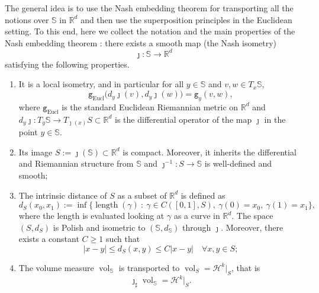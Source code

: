 \documentclass[10pt,leqno]{amsart}
\numberwithin{equation}{section}
\newcommand{\R}{\mathbb{R}}
\newcommand{\ttg}{\mathtt{g}}
\newcommand{\Ss}{\mathbb{S}}
\begin{document}
The general idea is to use the Nash embedding theorem for transporting all the notions over $\mathbb{S}$ in $\R^d$ and then use the superposition principles in the Euclidean setting. To this end, here we collect the notation and the main properties of the Nash embedding theorem \cite{nash1954c}: there exists a smooth map (the Nash isometry) 
\begin{equation}\label{eq: nash isometry}
    \jmath: \mathbb{S} \to \R^d
\end{equation}
satisfying the following properties.
\begin{enumerate}
    \item It is a local isometry, and in particular for all $y\in \Ss$ and $v,w \in T_x\Ss$,
    \begin{equation}
        \ttg_{\operatorname{Eucl}}\big( d_y \jmath (v) , d_y \jmath(w) \big) = \ttg_{y}(v,w),
    \end{equation}
    where $\ttg_{\operatorname{Eucl}}$ is the standard Euclidean Riemannian metric on $\R^d$ and $d_y \jmath: T_y \Ss \to T_{\jmath(x)}S\subset \R^d$ is the differential operator of the map $\jmath$ in the point $y\in \Ss$.
    \item Its image $S := \jmath(\mathbb{S}) \subset \R^d$ is compact. Moreover, it inherits the differential and Riemannian structure from $\mathbb{S}$ and $\jmath^{-1}: S \to \mathbb{S}$ is well-defined and smooth;
    \item The intrinsic distance of $S$ as a subset of $\R^d$ is defined as 
    \begin{equation}
        d_{S}(x_0,x_1) := \inf\{\operatorname{length}(\gamma) \ : \ \gamma \in C([0,1],S), \ \gamma(0) = x_0, \ \gamma(1) = x_1\},
    \end{equation}
    where the length is evaluated looking at $\gamma$ as a curve in $\R^d$. The space $(S,d_S)$ is Polish and isometric to $(\mathbb{S},d_{\mathbb{S}})$ through $\jmath$. Moreover, there exists a constant $C\geq 1$ such that 
    \begin{equation}\label{eq: equivalence}
        |x-y| \leq d_S(x,y)\leq C|x-y| \quad \forall x,y \in S;
    \end{equation}
    \item The volume measure $\operatorname{vol}_{\mathbb{S}}$ is transported to $\operatorname{vol}_{S} = \mathcal{H}^k|_{S}$, that is 
    \begin{equation}\label{eq: push for volume}
        \jmath_{\sharp} \operatorname{vol}_{\mathbb{S}} = \mathcal{H}^k|_{S}.
    \end{equation}

\end{enumerate}
\end{document}
